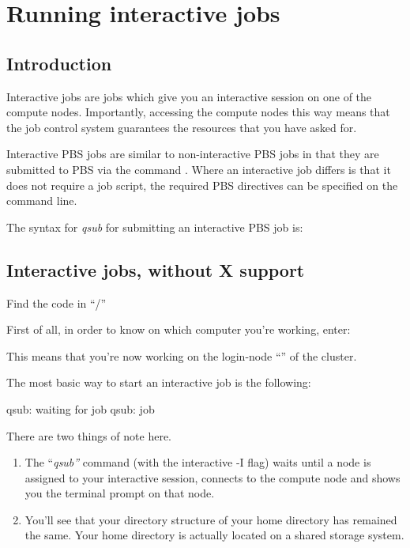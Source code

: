 \chapter{Running interactive jobs}
\label{ch:running-interactive-jobs}

\section{Introduction}

Interactive jobs are jobs which give you an interactive session on one of the
compute nodes. Importantly, accessing the compute nodes this way means that the
job control system guarantees the resources that you have asked for.

Interactive PBS jobs are similar to non-interactive PBS jobs in that they are
submitted to PBS via the command . Where an interactive job
differs is that it does not require a job script, the required PBS directives
can be specified on the command line.

The syntax for \emph{qsub} for submitting an interactive PBS job is:
\begin{prompt}
\end{prompt}

\section{Interactive jobs, without X support}

\begin{tip}
Find the code in
``\tilde/\exampledir''
\end{tip}

First of all, in order to know on which computer you're working, enter:
\begin{prompt}
\end{prompt}

This means that you're now working on the login-node ``\emph{\loginnode}'' of
the \hpc cluster.

The most basic way to start an interactive job is the following:
\begin{prompt}
qsub: waiting for job %
qsub: job %
\end{prompt}

There are two things of note here.

\begin{enumerate}
  \item  The ``\emph{qsub''} command (with the interactive -I
      flag) waits until a node is assigned to your interactive session,
      connects to the compute node and shows you the terminal prompt on that
      node.
  \item  You'll see that your directory structure of your home directory has
      remained the same. Your home directory is actually located on a shared
      storage system.
\end{enumerate}


